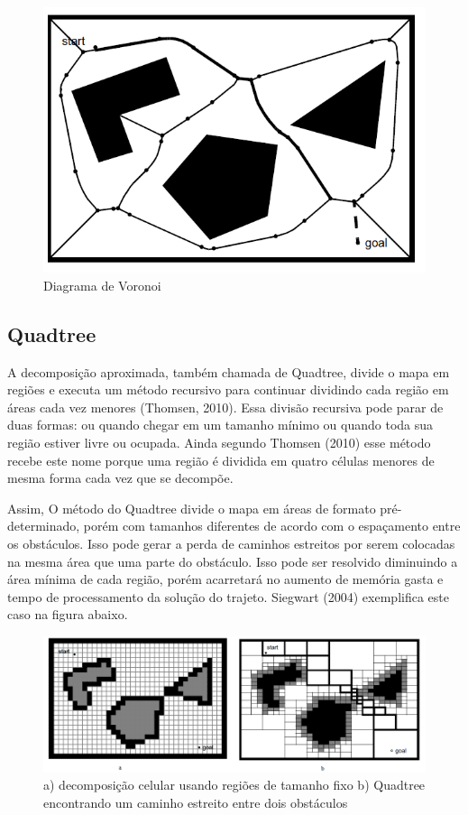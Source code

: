 \begin{figure}[h]
	\centering
	\label{fig08}
		\includegraphics[keepaspectratio=true,scale=0.6]{figuras/8voronoi.png}
	\caption{Diagrama de Voronoi}
\end{figure}

\subsection{Quadtree}

A decomposição aproximada, também chamada de Quadtree, divide o mapa em regiões e executa um método recursivo para continuar dividindo cada região em áreas cada vez menores (Thomsen, 2010). Essa divisão recursiva pode parar de duas formas: ou quando chegar em um tamanho mínimo ou quando toda sua região estiver livre ou ocupada. Ainda segundo Thomsen (2010) esse método recebe este nome porque uma região é dividida em quatro células menores de mesma forma cada vez que se decompõe.

Assim, O método do Quadtree divide o mapa em áreas de formato pré-determinado, porém com tamanhos diferentes de acordo com o espaçamento entre os obstáculos. Isso pode gerar a perda de caminhos estreitos por serem colocadas na mesma área que uma parte do obstáculo. Isso pode ser resolvido diminuindo a área mínima de cada região, porém acarretará no aumento de memória gasta e tempo de processamento da solução do trajeto. Siegwart (2004) exemplifica este caso na figura abaixo.

\begin{figure}[h]
	\centering
	\label{fig09}
		\includegraphics[keepaspectratio=true,scale=0.5]{figuras/9quadtree.png}
	\caption{ a) decomposição celular usando regiões de tamanho fixo b) Quadtree encontrando um caminho estreito entre dois obstáculos}
\end{figure}

